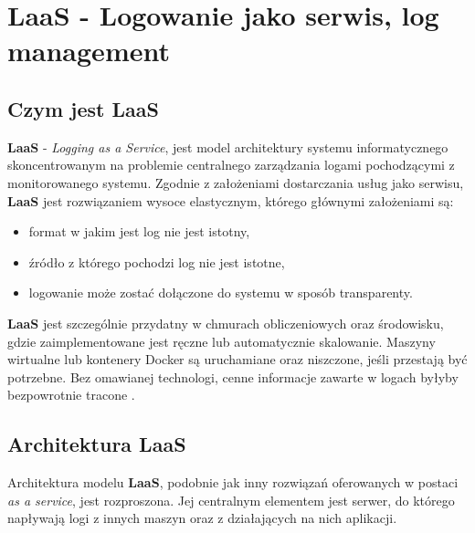 \section{\textbf{LaaS} - Logowanie jako serwis, log management}
\label{chapter:monitoring_architecture:laas}

    \subsection{Czym jest \textbf{LaaS}}
    \textbf{LaaS} - \textit{Logging as a Service}, jest model architektury systemu informatycznego
    skoncentrowanym na problemie centralnego zarządzania logami pochodzącymi z monitorowanego systemu.
    Zgodnie z założeniami dostarczania usług jako serwisu, \textbf{LaaS} jest rozwiązaniem
    wysoce elastycznym, którego głównymi założeniami są:
    \begin{itemize}
        \item format w jakim jest log nie jest istotny,
        \item źródło z którego pochodzi log nie jest istotne,
        \item logowanie może zostać dołączone do systemu w sposób transparenty.
    \end{itemize}
    
    \textbf{LaaS} jest szczególnie przydatny w chmurach obliczeniowych oraz
    środowisku, gdzie zaimplementowane jest ręczne lub automatycznie skalowanie.
    Maszyny wirtualne lub kontenery Docker są uruchamiane oraz niszczone, jeśli
    przestają być potrzebne. Bez omawianej technologi, cenne informacje zawarte w logach
    byłyby bezpowrotnie tracone \cite{log_management_explained}. 
    
    \subsection{Architektura LaaS}
    Architektura modelu \textbf{LaaS}, podobnie jak inny rozwiązań oferowanych w postaci \textit{as a service},
    jest rozproszona. Jej centralnym elementem jest serwer, do którego napływają logi
    z innych maszyn oraz z działających na nich aplikacji.
    
